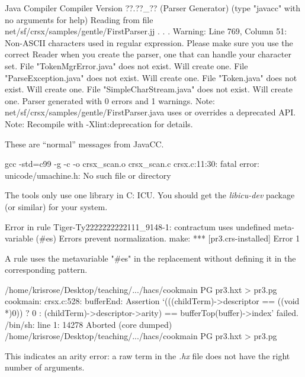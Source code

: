 \documentclass[11pt]{article} %
\begin{document}
\begin{error}\leavevmode
\begin{code}
Java Compiler Compiler Version ??.??_?? (Parser Generator)
(type "javacc" with no arguments for help)
Reading from file net/sf/crsx/samples/gentle/FirstParser.jj . . .
Warning: Line 769, Column 51: Non-ASCII characters used in regular expression.
Please make sure you use the correct Reader when you create the parser,
 one that can handle your character set.
File "TokenMgrError.java" does not exist.  Will create one.
File "ParseException.java" does not exist.  Will create one.
File "Token.java" does not exist.  Will create one.
File "SimpleCharStream.java" does not exist.  Will create one.
Parser generated with 0 errors and 1 warnings.
Note: net/sf/crsx/samples/gentle/FirstParser.java uses or overrides a deprecated API.
Note: Recompile with -Xlint:deprecation for details.
\end{code}
  These are ``normal'' messages from JavaCC.
\end{error}

\begin{error}\leavevmode
\begin{code}
gcc -std=c99 -g    -c -o crsx_scan.o crsx_scan.c
crsx.c:11:30: fatal error: unicode/umachine.h: No such file or directory
\end{code}
  The \HAX tools only use one library in C: ICU. You should get the \emph{libicu-dev} package (or
  similar) for your system.
\end{error}

\begin{error}\leavevmode
\begin{code}
Error in rule Tiger-Ty2222222222111_9148-1: contractum uses undefined meta-variable (#es)
Errors prevent normalization.
make: *** [pr3.crs-installed] Error 1
\end{code}
  A rule uses the metavariable "#es" in the replacement without defining it in the corresponding
  pattern.
\end{error}

\begin{error}[]\leavevmode
\begin{code}
/home/krisrose/Desktop/teaching/.../hacs/cookmain PG pr3.hxt > pr3.pg
cookmain: crsx.c:528: bufferEnd: Assertion
   `(((childTerm)->descriptor == ((void *)0)) ? 0 :
        (childTerm)->descriptor->arity) == bufferTop(buffer)->index' failed.
/bin/sh: line 1: 14278 Aborted
  (core dumped) /home/krisrose/Desktop/teaching/.../hacs/cookmain PG pr3.hxt > pr3.pg
\end{code}
  This indicates an arity error: a raw term in the \emph{.hx} file does not have the right number of
  arguments.
\end{error}



\end{document}
